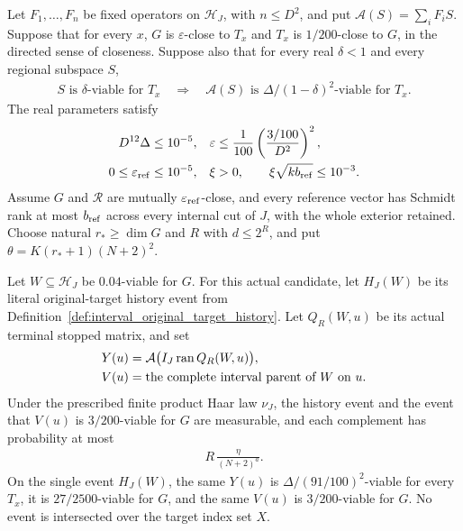 \begin{lemma}
    Let $F_1,\ldots,F_n$ be fixed operators on $\mathcal H_J$, with
    $n\le D^2$, and put $\mathcal A(S)=\sum_iF_iS$. Suppose that for
    every $x$, $G$ is $\varepsilon$-close to $T_x$ and $T_x$ is
    $1/200$-close to $G$, in the directed sense of closeness. Suppose also
    that for every real $\delta<1$ and every regional subspace $S$,
    \begin{align}
        S\text{ is $\delta$-viable for }T_x
        \quad\Longrightarrow\quad
        \mathcal A(S)\text{ is $\Delta/(1-\delta)^2$-viable for }T_x.
        \label{eq:fixed_interval_family_improvement}
    \end{align}
    The real parameters satisfy
    \begin{align}
        D^{12}\Delta              & \le10^{-5},                                           &
        \varepsilon               & \le\frac1{100}\left(\frac{3/100}{D^2}\right)^2,\notag   \\
        0\le\varepsilon_{\rm ref} & \le10^{-5},                                           &
        \xi                       & >0,\qquad \xi\sqrt{k b_{\rm ref}}\le10^{-3}.
        \label{eq:fixed_interval_precision_budgets}
    \end{align}
    Assume $G$ and $\mathcal R$ are mutually $\varepsilon_{\rm ref}$-close,
    and every reference vector has Schmidt rank at most $b_{\rm ref}$
    across every internal cut of $J$, with the whole exterior retained.
    Choose natural $r_*\ge\dim G$ and $R$ with $d\le2^R$, and put
    $\theta=K(r_*+1)(N+2)^2$.

    Let $W\subseteq\mathcal H_J$ be $0.04$-viable for $G$. For this
    actual candidate, let $H_J(W)$ be its literal original-target history
    event from Definition~\ref{def:interval_original_target_history}.
    Let $Q_R(W,u)$ be its actual terminal stopped matrix, and set
    \begin{align}
        Y(u) & =\mathcal A\bigl(I_J\operatorname{ran}Q_R(W,u)\bigr),\notag \\
        V(u) & =\text{the complete interval parent of }W\text{ on }u.
        \label{eq:fixed_interval_terminal_images}
    \end{align}
    Under the prescribed finite product Haar law $\nu_J$, the history
    event and the event that $V(u)$ is $3/200$-viable for $G$ are measurable,
    and each complement has probability at most
    \begin{align}
        R\,\frac{\eta}{(N+2)^a}.
        \label{eq:fixed_interval_history_failure}
    \end{align}
    On the single event $H_J(W)$, the same $Y(u)$ is
    $\Delta/(91/100)^2$-viable for every $T_x$, it is $27/2500$-viable
    for $G$, and the same $V(u)$ is $3/200$-viable for $G$.
    No event is intersected over the target index set $X$.
\end{lemma}
